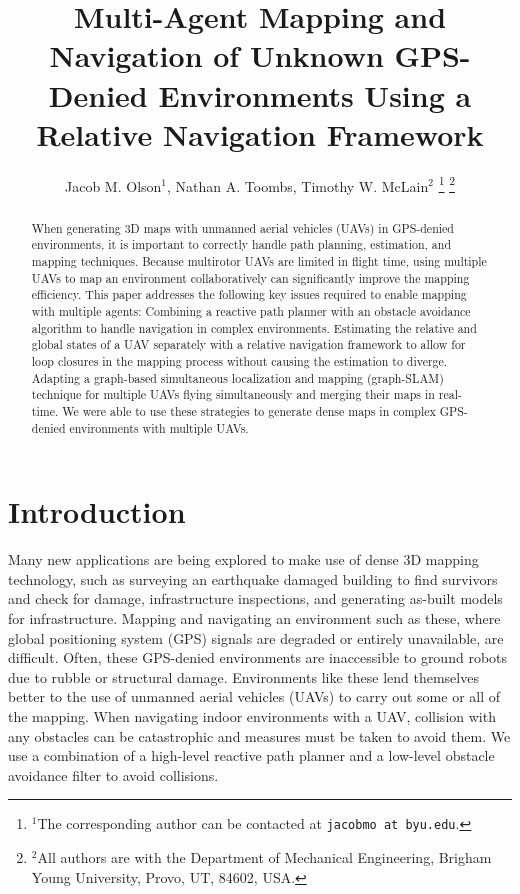 \documentclass[letterpaper, 10 pt, conference]{ieeeconf}  %
\title{\LARGE \bf
Multi-Agent Mapping and Navigation of Unknown GPS-Denied Environments Using a Relative Navigation Framework}
\author{Jacob M. Olson$^{1}$, Nathan A. Toombs, Timothy W. McLain$^{2}$%
\thanks{$^{1}$The corresponding author can be contacted at
        {\tt\small jacobmo at byu.edu}.}%
\thanks{$^{2}$All authors are with the Department of Mechanical Engineering,
        Brigham Young University, Provo, UT, 84602, USA.}%
}
\begin{document}
\maketitle
\thispagestyle{empty}
\pagestyle{empty}

\graphicspath{{figures/}}

\begin{abstract}

When generating 3D maps with unmanned aerial vehicles (UAVs) in GPS-denied environments, it is important to correctly handle path planning, estimation, and mapping techniques. Because multirotor UAVs are limited in flight time, using multiple UAVs to map an environment collaboratively can significantly improve the mapping efficiency. This paper addresses the following key issues required to enable mapping with multiple agents: Combining a reactive path planner with an obstacle avoidance algorithm to handle navigation in complex environments. Estimating the relative and global states of a UAV separately with a relative navigation framework to allow for loop closures in the mapping process without causing the estimation to diverge. Adapting a graph-based simultaneous localization and mapping (graph-SLAM) technique for multiple UAVs flying simultaneously and merging their maps in real-time. We were able to use these strategies to generate dense maps in complex GPS-denied environments with multiple UAVs.

\end{abstract}

\section{Introduction}

Many new applications are being explored to make use of dense 3D mapping technology, such as surveying an earthquake damaged building to find survivors and check for damage, infrastructure inspections, and generating as-built models for infrastructure. Mapping and navigating an environment such as these, where global positioning system (GPS) signals are degraded or entirely unavailable, are difficult. Often, these GPS-denied environments are inaccessible to ground robots due to rubble or structural damage. Environments like these lend themselves better to the use of unmanned aerial vehicles (UAVs) to carry out some or all of the mapping. When navigating indoor environments with a UAV, collision with any obstacles can be catastrophic and measures must be taken to avoid them. We use a combination of a high-level reactive path planner and a low-level obstacle avoidance filter to avoid collisions.
\end{document}
